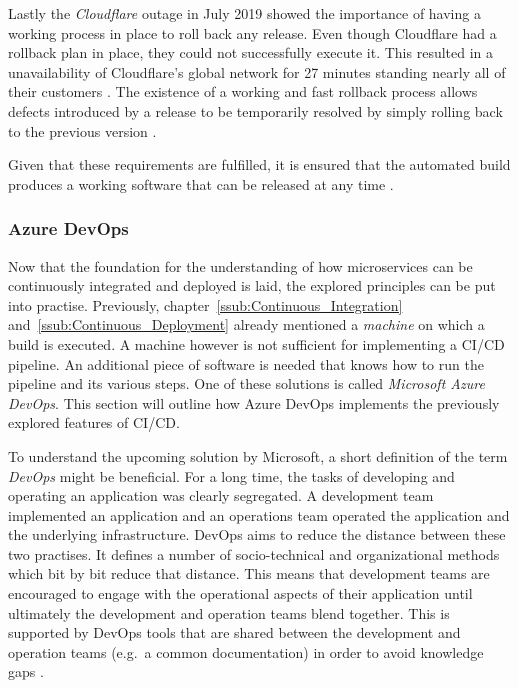 Lastly the \textit{Cloudflare} outage in July 2019 showed the importance of
having a working process in place to roll back any release. Even though
Cloudflare had a rollback plan in place, they could not successfully execute
it. This resulted in a unavailability of Cloudflare's global network for 27
minutes standing nearly all of their customers
\autocite{Graham-CummingDetailsCloudflareoutage2019}. The existence of a
working and fast rollback process allows defects introduced by a release to be
temporarily resolved by simply rolling back to the previous version
\autocite[p. 199]{MatyasContinuousIntegration2007}.

Given that these requirements are fulfilled, it is ensured that the automated
build produces a working software that can be released at any time \autocite[p.
200]{MatyasContinuousIntegration2007}.

\subsubsection{Azure DevOps}%
\label{ssub:Azure_DevOps}
Now that the foundation for the understanding of how microservices can be
continuously integrated and deployed is laid, the explored principles can be
put into practise. Previously, chapter~\ref{ssub:Continuous_Integration}
and~\ref{ssub:Continuous_Deployment} already mentioned a \textit{machine} on
which a build is executed. A machine however is not sufficient for implementing
a \ac{CI}/\ac{CD} pipeline. An additional piece of software is needed that
knows how to run the pipeline and its various steps. One of these solutions is
called \textit{Microsoft Azure DevOps}. This section will outline how Azure
DevOps implements the previously explored features of \ac{CI}/\ac{CD}.

To understand the upcoming solution by Microsoft, a short definition of the
term \textit{DevOps} might be beneficial. For a long time, the tasks of
developing and operating an application was clearly segregated. A development
team implemented an application and an operations team operated the application
and the underlying infrastructure. DevOps aims to reduce the distance between
these two practises. It defines a number of socio-technical and organizational
methods which bit by bit reduce that distance. This means that development
teams are encouraged to engage with the operational aspects of their
application until ultimately the development and operation teams blend
together. This is supported by DevOps tools that are shared between the
development and operation teams (e.g.\ a common documentation) in order to
avoid knowledge gaps \autocite{ArtacDevOpsIntroducingInfrastructure2017}.


